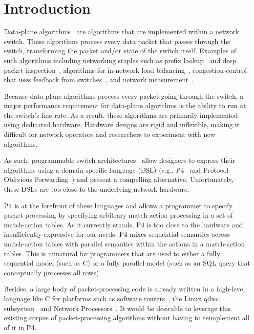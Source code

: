 \section{Introduction}
\label{s:intro}

Data-plane algorithms~\cite{cestan} are algorithms that are implemented within
a network switch. These algorithms process every data packet that passes
through the switch, transforming the packet and/or state of the switch itself.
Examples of such algorithms including networking staples such as prefix
lookup~\cite{lookup} and deep packet inspection~\cite{bro_ids}, algorithms for
in-network load balancing~\cite{conga, ecmp}, congestion-control that uses
feedback from switches~\cite{xcp, rcp, pdq, dctcp}, and network
measurement~\cite{minsketch, heavy_hitters}.

Because data-plane algorithms process every packet going through the switch, a
major performance requirement for data-plane algorithms is the ability to run
at the switch's line rate. As a result, these algorithms are primarily
implemented using dedicated hardware. Hardware designs are rigid and
inflexible, making it difficult for network operators and researchers to
experiment with new algorithms.

As such, programmable switch architectures~\cite{flexpipe, xpliant, rmt} allow
designers to express their algorithms using a domain-specific language (DSL)
(e.g., P4~\cite{p4} and Protocol-Oblivious Forwarding~\cite{pof}) and present
a compelling alternative.  Unfortunately, these DSLs are too close to the
underlying network hardware.

P4 is at the forefront of these languages and allows a programmer to specify
packet processing by specifying arbitrary match-action processing in a set of
match-action tables. As it currently stands, P4 is too close to the hardware
and insufficiently expressive for our needs. P4 mixes sequential semantics
across match-action tables with parallel semantics within the actions in a
match-action tables. This is unnatural for programmers that are used to either
a fully sequential model (such as C) or a fully parallel model (such as an SQL
query that conceptually processes all rows).

Besides, a large body of packet-processing code is already written in a
high-level language like C for platforms such as software routers~\cite{click},
the Linux qdisc subsystem~\cite{qdisc} and Network Processors~\cite{npu}. It
would be desirable to leverage this existing corpus of packet-processing
algorithms without having to reimplement all of it in P4.

